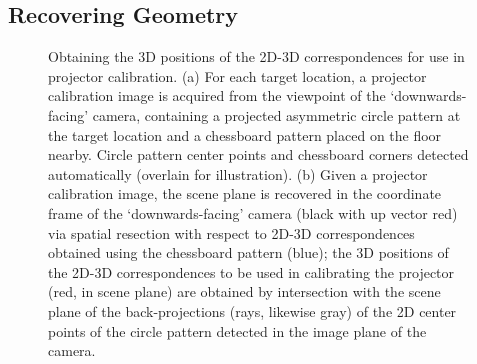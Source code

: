 \documentclass[review]{elsarticle}
\begin{document}
\subsection{Recovering Geometry}\label{sec:approach:geometry}

\begin{figure}[t]
    \centering
    \quad
    \caption{Obtaining the 3D positions of the 2D-3D correspondences for use in projector calibration. (a) For each target location, a projector calibration image is acquired from the viewpoint of the `downwards-facing' camera, containing a projected asymmetric circle pattern at the target location and a chessboard pattern placed on the floor nearby. Circle pattern center points and chessboard corners detected automatically (overlain for illustration). (b) Given a projector calibration image, the scene plane is recovered in the coordinate frame of the `downwards-facing' camera (black with up vector red) via spatial resection with respect to 2D-3D correspondences obtained using the chessboard pattern (blue); the 3D positions of the 2D-3D correspondences to be used in calibrating the projector (red, in scene plane) are obtained by intersection with the scene plane of the back-projections (rays, likewise gray) of the 2D center points of the circle pattern detected in the image plane of the camera.} %
    \label{fig:2d}
\end{figure}
\end{document}
